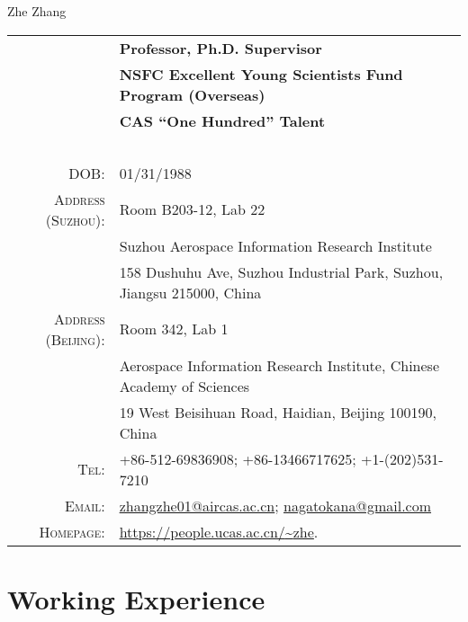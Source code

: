 \documentclass[paper=a4,fontsize=11pt]{scrartcl}
\newcommand{\sepspace}{\vspace*{1em}}		%
\newcommand{\MyName}[1]{
		\Huge \usefont{OT1}{phv}{b}{n} \hfill #1 		%
		\par \normalsize \normalfont}
\newcommand{\MySlogan}[1]{
		\large \usefont{OT1}{phv}{m}{n}\hfill \textit{#1} %
		\par \normalsize \normalfont}
\begin{document}

\MyName{Zhe Zhang}

\sepspace


\begin{tabular}{rl}
	& \textbf{Professor, Ph.D. Supervisor} \\
	& \textbf{NSFC Excellent Young Scientists Fund Program (Overseas)} \\
	& \textbf{CAS ``One Hundred'' Talent} \\
	~&~\\
\textsc{DOB:} & 01/31/1988 \\
\textsc{Address (Suzhou):} &  Room B203-12, Lab 22 \\
& Suzhou Aerospace Information Research Institute \\
& 158 Dushuhu Ave, Suzhou Industrial Park, Suzhou, Jiangsu 215000, China \\
\textsc{Address (Beijing):}	&  Room 342, Lab 1 \\
& Aerospace Information Research Institute, Chinese Academy of Sciences \\
& 19 West Beisihuan Road, Haidian, Beijing 100190, China \\
\textsc{Tel:} & +86-512-69836908; +86-13466717625; +1-(202)531-7210\\
\textsc{Email:} & \href{mailto:zhangzhe01@aircas.ac.cn}{zhangzhe01@aircas.ac.cn}; \href{mailto:nagatokana@gmail.com}{nagatokana@gmail.com} \\
\textsc{Homepage:} & \href{https://people.ucas.ac.cn/~zhe}{https://people.ucas.ac.cn/{\textasciitilde}zhe}.
\end{tabular}


\section*{Working Experience}
\end{document}
